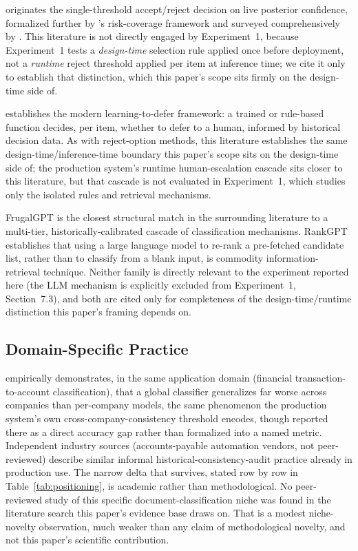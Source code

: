 \documentclass[11pt]{article}
\begin{document}
\citet{chow1970} originates the single-threshold accept/reject decision on
live posterior confidence, formalized further by \citet{elyaniv2010}'s
risk-coverage framework and surveyed comprehensively by
\citet{hendrickx2024}. This literature is not directly engaged by
Experiment~1, because Experiment~1 tests a \emph{design-time}
selection rule applied once before deployment, not a \emph{runtime} reject
threshold applied per item at inference time; we cite it only to establish
that distinction, which this paper's scope sits firmly on the design-time
side of.

\citet{mozannarsontag2020} establishes the modern learning-to-defer
framework: a trained or rule-based function decides, per item, whether to
defer to a human, informed by historical decision data. As with
reject-option methods, this literature establishes the same
design-time/inference-time boundary this paper's scope sits on the design-time
side of; the production system's runtime human-escalation cascade sits closer
to this literature, but that cascade is not evaluated in Experiment~1, which
studies only the isolated rules and retrieval mechanisms.

FrugalGPT \citep{frugalgpt2023} is the closest structural match in the
surrounding literature to a multi-tier, historically-calibrated cascade of
classification mechanisms. RankGPT \citep{rankgpt2023} establishes that
using a large language model to re-rank a pre-fetched candidate list, rather
than to classify from a blank input, is commodity information-retrieval
technique. Neither family is directly relevant to the
experiment reported here (the LLM mechanism is explicitly excluded from
Experiment~1, Section~7.3), and both are cited only for completeness of the
design-time/runtime distinction this paper's framing depends on.

\subsection{Domain-Specific Practice}
\label{sec:domain-practice}

\citet{jorgensenigel2021} empirically demonstrates, in the same application
domain (financial transaction-to-account classification), that a global
classifier generalizes far worse across companies than per-company models,
the same phenomenon the production system's own cross-company-consistency
threshold encodes, though reported there as a direct accuracy gap rather than
formalized into a named metric. Independent industry sources (accounts-payable
automation vendors, not peer-reviewed) \citep{kenfromfinance2025,peakflo2025,ramp2025} describe
similar informal historical-consistency-audit practice already in production
use. The narrow delta that survives, stated row by row in
Table~\ref{tab:positioning}, is academic rather than methodological. No
peer-reviewed study of this specific document-classification niche was found
in the literature search this paper's evidence base draws on. That is a
modest niche-novelty observation, much weaker than any claim of
methodological novelty, and not
this paper's scientific contribution.
\end{document}
